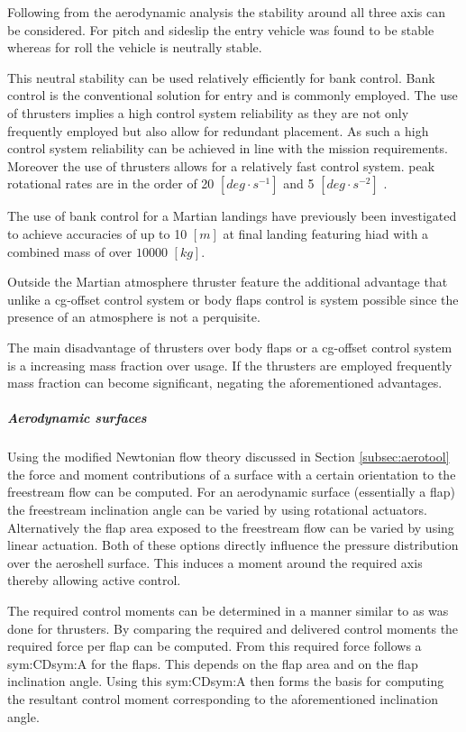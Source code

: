Following from the aerodynamic analysis the stability around all three axis can be considered. For pitch and sideslip the entry vehicle was found to be stable whereas for roll the vehicle is neutrally stable. 

This neutral stability can be used relatively efficiently for bank control. Bank control is the conventional solution for entry and is commonly employed. The use of thrusters implies a high control system reliability as they are not only frequently employed but also allow for redundant placement. As such a high control system reliability can be achieved in line with the mission requirements. Moreover the use of thrusters allows for a relatively fast control system. peak rotational rates are in the order of 20 $[deg\cdot s^{-1}]$ and 5 $[deg \cdot s^{-2}]$ \cite{Davis2010}.

The use of bank control for a Martian landings have previously been investigated \cite{Davis2010} to achieve accuracies of up to 10 $[m]$ at final landing featuring \gls{hiad} with a combined mass of over $10 000$ $\left[kg\right]$.

Outside the Martian atmosphere thruster feature the additional advantage that unlike a \gls{cg}-offset control system or body flaps control is system possible since the presence of an atmosphere is not a perquisite.

The main disadvantage of thrusters over body flaps or a \gls{cg}-offset control system is a increasing mass fraction over usage. If the thrusters are employed frequently mass fraction can become significant, negating the aforementioned advantages.


\subparagraph{Aerodynamic surfaces}

Using the modified Newtonian flow theory discussed in Section \ref{subsec:aerotool} the force and moment contributions of a surface with a certain orientation to the freestream flow can be computed. For an aerodynamic surface (essentially a flap) the freestream inclination angle can be varied by using rotational actuators. Alternatively the flap area exposed to the freestream flow can be varied by using linear actuation. Both of these options directly influence the pressure distribution over the aeroshell surface. This induces a moment around the required axis thereby allowing active control.

The required control moments can be determined in a manner similar to as was done for thrusters. By comparing the required and delivered control moments the required force per flap can be computed. From this required force follows a \gls{sym:CD}\gls{sym:A} for the flaps. This depends on the flap area and on the flap inclination angle. Using this \gls{sym:CD}\gls{sym:A} then forms the basis for computing the resultant control moment corresponding to the aforementioned inclination angle.

